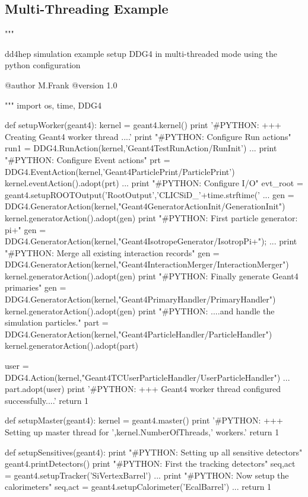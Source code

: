 \subsection{\DDG Multi-Threading Example}
\label{sec:ddg4-multi-threading-example}
\begin{code}
"""

   dd4hep simulation example setup DDG4
   in multi-threaded mode using the python configuration

   @author  M.Frank
   @version 1.0

"""
import os, time, DDG4

def setupWorker(geant4):
  kernel = geant4.kernel()
  print '#PYTHON: +++ Creating Geant4 worker thread ....'
  print "#PYTHON:  Configure Run actions"
  run1 = DDG4.RunAction(kernel,'Geant4TestRunAction/RunInit')
    ...
  print "#PYTHON:  Configure Event actions"
  prt = DDG4.EventAction(kernel,'Geant4ParticlePrint/ParticlePrint')
  kernel.eventAction().adopt(prt)
    ...
  print "\n#PYTHON:  Configure I/O\n"
  evt_root = geant4.setupROOTOutput('RootOutput','CLICSiD_'+time.strftime('%
    ...
  gen = DDG4.GeneratorAction(kernel,"Geant4GeneratorActionInit/GenerationInit")
  kernel.generatorAction().adopt(gen)
  print "#PYTHON:  First particle generator: pi+"
  gen = DDG4.GeneratorAction(kernel,"Geant4IsotropeGenerator/IsotropPi+");
    ...
  print "#PYTHON:  Merge all existing interaction records"
  gen = DDG4.GeneratorAction(kernel,"Geant4InteractionMerger/InteractionMerger")
  kernel.generatorAction().adopt(gen)
  print "#PYTHON:  Finally generate Geant4 primaries"
  gen = DDG4.GeneratorAction(kernel,"Geant4PrimaryHandler/PrimaryHandler")
  kernel.generatorAction().adopt(gen)
  print "#PYTHON:  ....and handle the simulation particles."
  part = DDG4.GeneratorAction(kernel,"Geant4ParticleHandler/ParticleHandler")
  kernel.generatorAction().adopt(part)

  user = DDG4.Action(kernel,"Geant4TCUserParticleHandler/UserParticleHandler")
    ...
  part.adopt(user)
  print '#PYTHON: +++ Geant4 worker thread configured successfully....'
  return 1
  
def setupMaster(geant4):
  kernel = geant4.master()
  print '#PYTHON: +++ Setting up master thread for ',kernel.NumberOfThreads,' workers.'
  return 1

def setupSensitives(geant4):
  print "#PYTHON:  Setting up all sensitive detectors"
  geant4.printDetectors()
  print "#PYTHON:  First the tracking detectors"
  seq,act = geant4.setupTracker('SiVertexBarrel')
    ...
  print "#PYTHON:  Now setup the calorimeters"
  seq,act = geant4.setupCalorimeter('EcalBarrel')
    ...
  return 1


\end{code}
